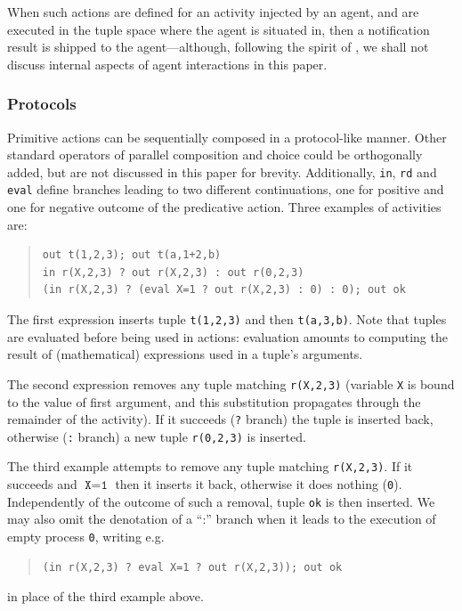 \documentclass[12pt,a4paper,twoside,openright]{book}
\begin{document}
When such actions are defined for an activity injected by an agent, and are executed in the tuple space where the agent is situated in, then a notification result is shipped to the agent---although, following the spirit of \cite{zavattaro}, we shall not discuss internal aspects of agent interactions in this paper.

\subsubsection*{Protocols}

Primitive actions can be sequentially composed in a protocol-like manner.
%
Other standard operators of parallel composition and choice could be orthogonally added, but are not discussed in this paper for brevity.
%
Additionally, \texttt{in}, \texttt{rd} and \texttt{eval} define branches leading to two different continuations, one for positive and one for negative outcome of the predicative action.
%
Three examples of activities are:

{\codefont\begin{quote} 
\begin{verbatim}
out t(1,2,3); out t(a,1+2,b)
in r(X,2,3) ? out r(X,2,3) : out r(0,2,3)
(in r(X,2,3) ? (eval X=1 ? out r(X,2,3) : 0) : 0); out ok
\end{verbatim}\end{quote}
}

\noindent The first expression inserts tuple \texttt{t(1,2,3)} and then \texttt{t(a,3,b)}.
%
Note that tuples are evaluated before being used in actions: evaluation amounts to computing the result of (mathematical) expressions used in a tuple's arguments.

The second expression removes any tuple matching \texttt{r(X,2,3)} (variable \texttt{X} is bound to the value of first argument, and this substitution propagates through the remainder of the activity).
%
If it succeeds (\texttt{?} branch) the tuple is inserted back, otherwise (\texttt{:} branch) a new tuple \texttt{r(0,2,3)} is inserted.

The third example attempts to remove any tuple matching \texttt{r(X,2,3)}.
%
If it succeeds and $\texttt{X}=\texttt{1}$ then it inserts it back, otherwise it does nothing (\texttt{0}).
%
Independently of the outcome of such a removal, tuple \texttt{ok} is then inserted.
%
We may also omit the denotation of a ``:'' branch when it leads to the execution of empty process \texttt{0}, writing e.g.
{\begin{quote}
\begin{verbatim}
(in r(X,2,3) ? eval X=1 ? out r(X,2,3)); out ok
\end{verbatim}\end{quote}
}
\noindent
in place of the third example above.
\end{document}
